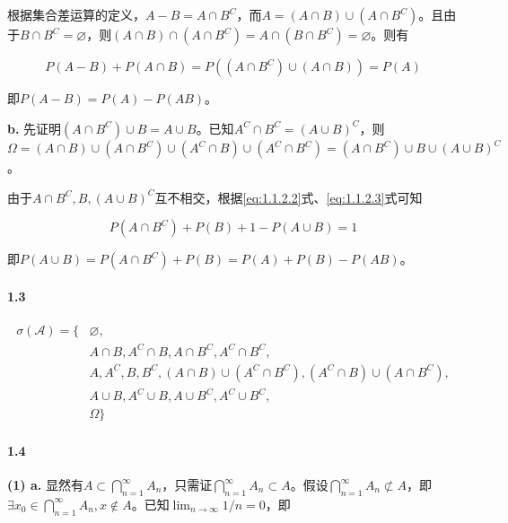 \documentclass{article}
\begin{document}
    根据集合差运算的定义，$A - B = A\cap B^C$，而$A = (A\cap B) \cup \left(A\cap B^C\right)$。且由于$B\cap B^C = \varnothing$，则$(A\cap B) \cap \left(A\cap B^C\right) = A \cap \left(B\cap B^C\right)= \varnothing$。则有

    \begin{equation}
        P(A - B) + P(A\cap B) = P((A\cap B^C)\cup (A\cap B)) = P(A)
        \label{eq:1.1.2.3}
    \end{equation}

    即$P(A - B) = P(A) - P(AB)$。

    \textbf{b.} 先证明$\left(A\cap B^C\right) \cup B = A\cup B$。已知$A^C\cap B^C = (A\cup B)^C$，则$\Omega = (A\cap B)\cup \left(A\cap B^C\right) \cup \left(A^C \cap B\right) \cup \left(A^C\cap B^C\right) = \left(A\cap B^C\right) \cup B \cup (A\cup B)^C$。

    由于$A\cap B^C, B, (A\cup B)^C$互不相交，根据\ref{eq:1.1.2.2}式、\ref{eq:1.1.2.3}式可知

    \begin{equation}
        P\left(A\cap B^C\right) + P(B) + 1 - P(A\cup B) = 1
    \end{equation}

    即$P(A\cup B) = P\left(A\cap B^C\right) + P(B) = P(A) + P(B) - P(AB)$。

    \paragraph*{1.3} \begin{equation}
        \begin{aligned}
            \sigma(\mathcal A) = \{&\varnothing, \\
            & A\cap B, A^C\cap B, A\cap B^C, A^C\cap B^C, \\
            & A, A^C, B, B^C, (A\cap B)\cup(A^C\cap B^C), (A^C\cap B)\cup (A\cap B^C), \\
            & A\cup B, A^C\cup B, A\cup B^C, A^C\cup B^C, \\
            & \Omega\}
        \end{aligned}
    \end{equation}

    \paragraph*{1.4} \textbf{(1) a.} 显然有$A\subset \bigcap _{n=1} ^{\infty} A_n$，只需证$\bigcap _{n=1} ^{\infty} A_n \subset A$。假设$\bigcap _{n=1} ^{\infty} A_n \not\subset A$，即$\exists x_0\in \bigcap _{n=1} ^{\infty} A_n, x\not\in A$。已知$\lim_{n\rightarrow \infty} 1/n = 0$，即
\end{document}
